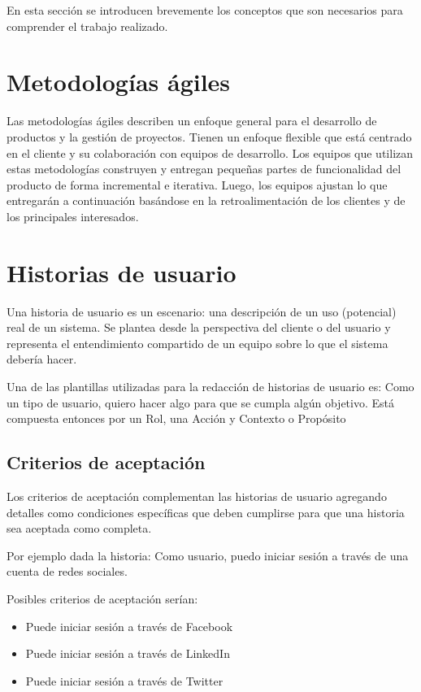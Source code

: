 En esta sección se introducen brevemente los conceptos que son necesarios para comprender el trabajo realizado.
\section{Metodologías ágiles}

Las metodologías ágiles describen un enfoque general para el desarrollo de productos y la gestión de proyectos. Tienen un enfoque flexible que está centrado en el cliente y su colaboración con equipos de desarrollo. Los equipos que utilizan estas metodologías construyen y entregan pequeñas partes de funcionalidad del producto de forma incremental e iterativa. Luego, los equipos ajustan lo que entregarán a continuación basándose en la retroalimentación de los clientes y de los principales interesados.
\cite{cohan_agile}
\section{Historias de usuario}
Una historia de usuario es un escenario: una descripción de un uso (potencial) real de un sistema. Se plantea desde la perspectiva del cliente o del usuario y representa el entendimiento compartido de un equipo sobre lo que el sistema debería hacer.\cite{wake_definition}

Una de las plantillas utilizadas para la redacción de historias de usuario es: Como un tipo de usuario, quiero hacer algo para que se cumpla algún objetivo. Está compuesta entonces por un Rol, una Acción y Contexto o Propósito
\subsection{Criterios de aceptación}

Los criterios de aceptación complementan las historias de usuario agregando detalles como condiciones específicas que deben cumplirse para que una historia sea aceptada como completa. \cite{cohan_details}

Por ejemplo dada la historia: Como usuario, puedo iniciar sesión a través de una cuenta de redes sociales.

Posibles criterios de aceptación serían:
\begin{itemize}
    \item Puede iniciar sesión a través de Facebook
    \item Puede iniciar sesión a través de LinkedIn
    \item Puede iniciar sesión a través de Twitter
\end{itemize}

